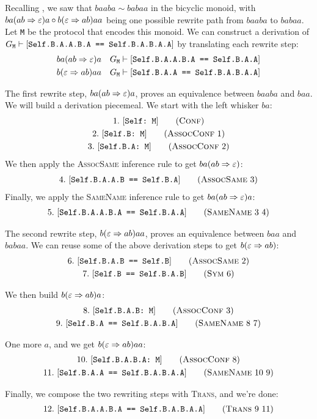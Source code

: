 \documentclass[../generics]{subfiles}
\begin{document}
\begin{example}
Recalling , we saw that $baaba\sim babaa$ in the bicyclic monoid, with $ba(ab\Rightarrow\varepsilon) a \circ b(\varepsilon\Rightarrow ab) aa$ being one possible rewrite path from $baaba$ to $babaa$. Let \texttt{M} be the protocol that encodes this monoid. We can construct a derivation of $G_\texttt{M}\vdash[\texttt{Self.B.A.A.B.A == Self.B.A.B.A.A}]$ by translating each rewrite step:
\begin{align*}
&ba(ab\Rightarrow\varepsilon) a&&G_\texttt{M}\vdash[\texttt{Self.B.A.A.B.A == Self.B.A.A}]\\
&b(\varepsilon\Rightarrow ab) aa&&G_\texttt{M}\vdash[\texttt{Self.B.A.A == Self.B.A.B.A.A}]
\end{align*}

The first rewrite step, $ba(ab\Rightarrow\varepsilon) a$, proves an equivalence between $baaba$ and $baa$. We will build a derivation piecemeal. We start with the left whisker $ba$:
\begin{gather*}
\ConfStep{Self}{M}{1}\\
\AssocConfStep{1}{Self.B}{M}{2}\\
\AssocConfStep{2}{Self.B.A}{M}{3}
\end{gather*}
We then apply the \textsc{AssocSame} inference rule to get $ba(ab\Rightarrow\varepsilon)$:
\begin{gather*}
\AssocSameStep{3}{Self.B.A.A.B}{Self.B.A}{4}
\end{gather*}
Finally, we apply the \textsc{SameName} inference rule to get $ba(ab\Rightarrow\varepsilon) a$:
\begin{gather*}
\SameNameStep{3}{4}{Self.B.A.A.B.A}{Self.B.A.A}{5}
\end{gather*}

The second rewrite step, $b(\varepsilon\Rightarrow ab) aa$, proves an equivalence between $baa$ and $babaa$. We can reuse some of the above derivation steps to get $b(\varepsilon\Rightarrow ab)$:
\begin{gather*}
\AssocSameStep{2}{Self.B.A.B}{Self.B}{6}\\
\SymStep{6}{Self.B}{Self.B.A.B}{7}
\end{gather*}

We then build $b(\varepsilon\Rightarrow ab) a$:
\begin{gather*}
\AssocConfStep{3}{Self.B.A.B}{M}{8}\\
\SameNameStep{8}{7}{Self.B.A}{Self.B.A.B.A}{9}
\end{gather*}

One more $a$, and we get $b(\varepsilon\Rightarrow ab) aa$:
\begin{gather*}
\AssocConfStep{8}{Self.B.A.B.A}{M}{10}\\
\SameNameStep{10}{9}{Self.B.A.A}{Self.B.A.B.A.A}{11}
\end{gather*}

Finally, we compose the two rewriting steps with \textsc{Trans}, and we're done:
\begin{gather*}
\TransStep{9}{11}{Self.B.A.A.B.A}{Self.B.A.B.A.A}{12}
\end{gather*}
\end{example}
\end{document}
